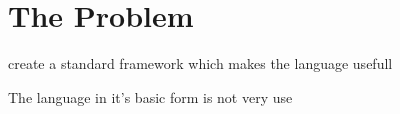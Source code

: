 \chapter{The Problem}
create a standard framework which makes the language usefull

The language in it's basic form is not very use

